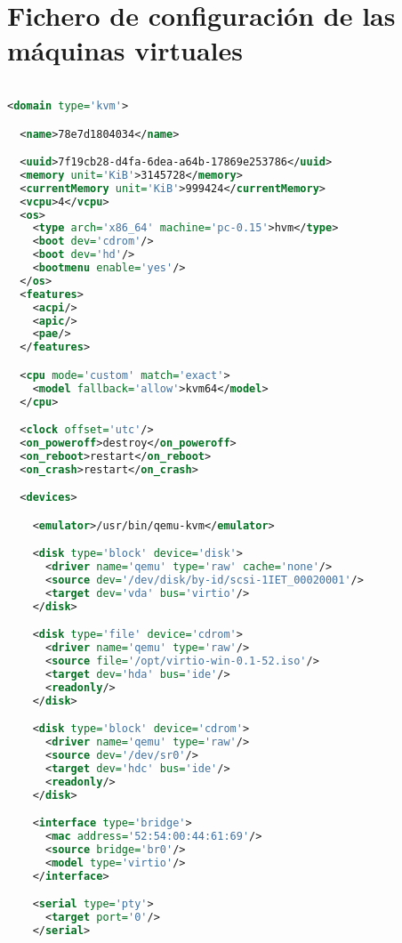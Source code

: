 \documentclass[spanisheDIVcalc,twoside,parskip-,pointlessnumbers,final]{scrbook}
\newcommand{\clearemptydoublepage}{\newpage{\pagestyle{empty}\cleardoublepage}}
\begin{document}
\clearemptydoublepage
\chapter{Fichero de configuración de las máquinas virtuales}
\begin{lstlisting}[language=XML,
    label=78e7d1804034,
    title={78e7d1804034.xml},
    showstringspaces=false,
    breaklines=true,
    formfeed=\newpage,
    tabsize=4,
    basicstyle=\small,
    stringstyle=\color{mymauve},
    commentstyle=\itshape\color{mygreen},
    keywordstyle=\bfseries\color{blue},
    numberstyle=\tiny\color{mygray},
    basicstyle=\ttfamily]

<domain type='kvm'>

  <name>78e7d1804034</name>

  <uuid>7f19cb28-d4fa-6dea-a64b-17869e253786</uuid>
  <memory unit='KiB'>3145728</memory>
  <currentMemory unit='KiB'>999424</currentMemory>
  <vcpu>4</vcpu>
  <os>
    <type arch='x86_64' machine='pc-0.15'>hvm</type>
    <boot dev='cdrom'/>
    <boot dev='hd'/>
    <bootmenu enable='yes'/>
  </os>
  <features>
    <acpi/>
    <apic/>
    <pae/>
  </features>

  <cpu mode='custom' match='exact'>
    <model fallback='allow'>kvm64</model>
  </cpu>

  <clock offset='utc'/>
  <on_poweroff>destroy</on_poweroff>
  <on_reboot>restart</on_reboot>
  <on_crash>restart</on_crash>

  <devices>

    <emulator>/usr/bin/qemu-kvm</emulator>

    <disk type='block' device='disk'>
      <driver name='qemu' type='raw' cache='none'/>
      <source dev='/dev/disk/by-id/scsi-1IET_00020001'/>
      <target dev='vda' bus='virtio'/>
    </disk>

    <disk type='file' device='cdrom'>
      <driver name='qemu' type='raw'/>
      <source file='/opt/virtio-win-0.1-52.iso'/>
      <target dev='hda' bus='ide'/>
      <readonly/>
    </disk>

    <disk type='block' device='cdrom'>
      <driver name='qemu' type='raw'/>
      <source dev='/dev/sr0'/>
      <target dev='hdc' bus='ide'/>
      <readonly/>
    </disk>

    <interface type='bridge'>
      <mac address='52:54:00:44:61:69'/>
      <source bridge='br0'/>
      <model type='virtio'/>
    </interface>

    <serial type='pty'>
      <target port='0'/>
    </serial>


\end{lstlisting}
\end{document}
